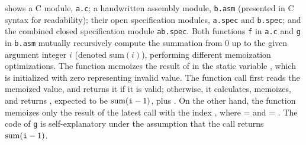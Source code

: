  shows a C module, \texttt{a.c}; a handwritten
assembly module, \texttt{b.asm} (presented in C syntax for
readability); their open specification modules, \texttt{a.spec} and
\texttt{b.spec}; and the combined closed specification module
\texttt{ab.spec}.  Both functions \texttt{f} in \texttt{a.c} and
\texttt{g} in \texttt{b.asm} mutually recursively compute the
summation from $0$ up to the given argument integer $i$ (denoted
$\mathrm{sum}(i)$), performing different memoization optimizations.
The function  memoizes the result of  in the static
variable , which is initialized with zero
representing invalid value.  The function call  first reads
the memoized value, and returns it if it is valid; otherwise, it
calculates, memoizes, and returns , expected to be
$\mathrm{sum}(\texttt{i}-1)$, plus .  On the other hand, the
function  memoizes only the result of the latest call
 with the index , where  =
 and  = .  The code of \texttt{g}
is self-explanatory under the assumption that the call 
returns $\mathrm{sum}(\texttt{i}-1)$.





